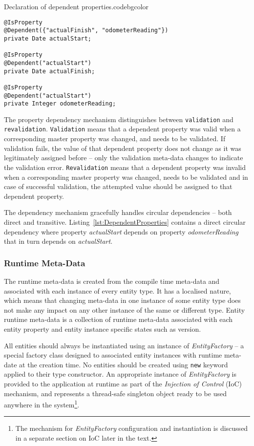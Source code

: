   \begin{code}{Declaration of dependent properties.}{\label{lst:DependentProperties}}{codebgcolor}
    \begin{lstlisting}
@IsProperty
@Dependent({"actualFinish", "odometerReading"})
private Date actualStart;

@IsProperty
@Dependent("actualStart")
private Date actualFinish;

@IsProperty
@Dependent("actualStart")
private Integer odometerReading;
    \end{lstlisting}
  \end{code}

  The property dependency mechanism distinguishes between \texttt{validation} and \texttt{revalidation}.
  \texttt{Validation} means that a dependent property was valid when a corresponding master property was changed, and needs to be validated.
  If validation fails, the value of that dependent property does not change as it was legitimately assigned before -- only the validation meta-data changes to indicate the validation error.
  \texttt{Revalidation} means that a dependent property was invalid when a corresponding master property was changed, needs to be validated and in case of successful validation, the attempted value should be assigned to that dependent property.
  
  The dependency mechanism gracefully handles circular dependencies -- both direct and transitive.
  Listing~\ref{lst:DependentProperties} contains a direct circular dependency where property \emph{actualStart} depends on property \emph{odometerReading} that in turn depends on \emph{actualStart}.
  

\subsubsection{Runtime Meta-Data}

  The runtime meta-data is created from the compile time meta-data and associated with each instance of every entity type.
  It has a localised nature, which means that changing meta-data in one instance of some entity type does not make any impact on any other instance of the same or different type.
  Entity runtime meta-data is a collection of runtime meta-data associated with each entity property and entity instance specific states such as version.
  
  All entities should always be instantiated using an instance of \emph{EntityFactory} -- a special factory class designed to associated entity instances with runtime meta-date at the creation time.  
  No entities should be created using \texttt{new} keyword applied to their type constructor.
  An appropriate instance of \emph{EntityFactory} is provided to the application at runtime as part of the \emph{Injection of Control} (IoC) mechanism, and represents a thread-safe singleton object ready to be used anywhere in the system\footnote{The mechanism for \emph{EntityFactory} configuration and instantiation is discussed in a separate section on IoC later in the text.}.
  
